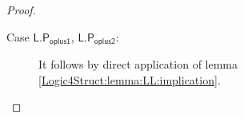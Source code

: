 \begin{proof}
\begin{description}
    \item[Case $\mathsf{L.P_{oplus1}}$, $\mathsf{L.P_{oplus2}}$: ]
      It follows by direct application of lemma \ref{Logic4Struct:lemma:LL:implication}.
 \end{description}
\end{proof}








